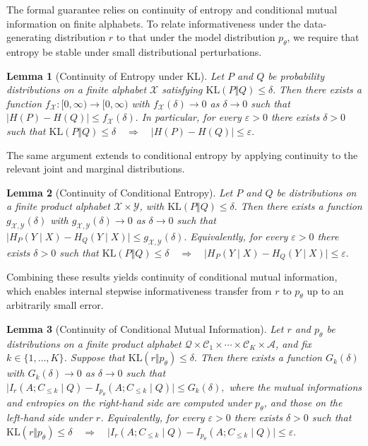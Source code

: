 \documentclass{article}
\newtheorem{lemma}{Lemma}
\begin{document}
The formal guarantee relies on continuity of entropy and conditional mutual information on finite alphabets. To relate informativeness under the data-generating distribution $r$ to that under the model distribution $p_\theta$, we require that entropy be stable under small distributional perturbations. 

\begin{lemma}[Continuity of Entropy under KL]\label{lemma:entropy-continuity}
Let $P$ and $Q$ be probability distributions on a finite alphabet
$\mathcal{X}$ satisfying $\mathrm{KL}(P \Vert Q) \le \delta.$
Then there exists a function $f_\mathcal{X} : [0,\infty) \to [0,\infty)$
with $f_\mathcal{X}(\delta) \to 0$ as $\delta \to 0$ such that $\bigl| H(P) - H(Q) \bigr| \le f_\mathcal{X}(\delta).$ In particular, for every $\varepsilon > 0$ there exists
$\delta > 0$ such that $\mathrm{KL}(P \Vert Q) \le \delta \quad\Longrightarrow\quad
\bigl| H(P) - H(Q) \bigr| \le \varepsilon.$
\end{lemma}

The same argument extends to conditional entropy by applying continuity to the relevant joint and marginal distributions. 

\begin{lemma}[Continuity of Conditional Entropy]\label{lemma:cond-entropy-continuity}
Let $P$ and $Q$ be distributions on a finite product alphabet
$\mathcal{X} \times \mathcal{Y}$, with $\mathrm{KL}(P \Vert Q) \le \delta.$
Then there exists a function $g_{\mathcal{X},\mathcal{Y}}(\delta)$
with $g_{\mathcal{X},\mathcal{Y}}(\delta) \to 0$ as $\delta \to 0$
such that $\bigl| H_P(Y \mid X) - H_Q(Y \mid X) \bigr|
\le g_{\mathcal{X},\mathcal{Y}}(\delta).$
Equivalently, for every $\varepsilon > 0$ there exists $\delta > 0$
such that $\mathrm{KL}(P \Vert Q) \le \delta
\quad\Longrightarrow\quad
\bigl| H_P(Y \mid X) - H_Q(Y \mid X) \bigr| \le \varepsilon.$
\end{lemma}

Combining these results yields continuity of conditional mutual information, which enables internal stepwise informativeness transfer from $r$ to $p_\theta$ up to an arbitrarily small error.

\begin{lemma}[Continuity of Conditional Mutual Information]\label{lemma:mi-continuity}
Let $r$ and $p_\theta$ be distributions on a finite product alphabet
$\mathcal{Q}\times\mathcal{C}_1\times\cdots\times\mathcal{C}_K
\times\mathcal{A}$, and fix $k\in\{1,\dots,K\}$. Suppose that $\mathrm{KL}(r \Vert p_\theta) \le \delta.$ Then there exists a function $G_k(\delta)$ with $G_k(\delta)\to 0$ as
$\delta\to 0$ such that $\bigl|
I_r(A; C_{\le k} \mid Q)
-
I_{p_\theta}(A; C_{\le k} \mid Q)
\bigr|
\le G_k(\delta),$ where the mutual informations and entropies on the right-hand side are computed under $p_\theta$, and those on the left-hand side under $r$. Equivalently, for every $\varepsilon>0$ there exists $\delta>0$ such
that $\mathrm{KL}(r \Vert p_\theta) \le \delta
\quad\Longrightarrow\quad
\bigl|
I_r(A; C_{\le k} \mid Q)
-
I_{p_\theta}(A; C_{\le k} \mid Q)
\bigr|
\le \varepsilon.$
\end{lemma}
\end{document}
